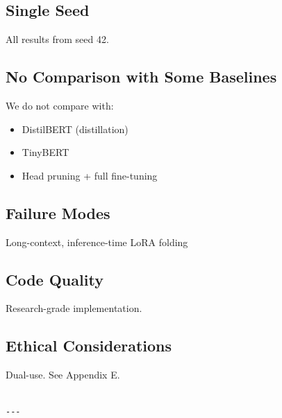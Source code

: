 \subsection{Single Seed}

All results from seed 42.

\subsection{No Comparison with Some Baselines}

We do not compare with:
\begin{itemize}
\item DistilBERT (distillation)
\item TinyBERT
\item Head pruning + full fine-tuning

\end{itemize}
\subsection{Failure Modes}

Long-context, inference-time LoRA folding

\subsection{Code Quality}

Research-grade implementation.

\subsection{Ethical Considerations}

Dual-use. See Appendix E.
\begin{lstlisting}

---
\end{lstlisting}